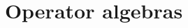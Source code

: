 

\usepackage{marginnote}


\title{Operator algebras}
\hypertarget{001F}{}
\reversemarginpar{}
\label{operatoralgebras}

\maketitle


\tableofcontents










